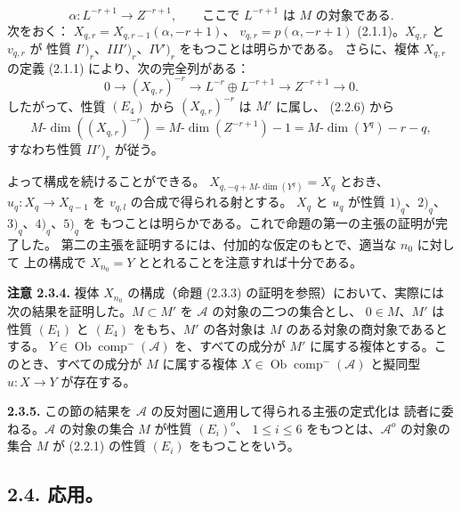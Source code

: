 \clearpage
{}%
\begingroup\small\setlength{\parskip}{0pt}\setlength{\emergencystretch}{1.5em}
\setlength{\abovedisplayskip}{4pt plus 2pt minus 2pt}%
\setlength{\belowdisplayskip}{4pt plus 2pt minus 2pt}%

\[
\alpha\colon L^{-r+1}\longrightarrow Z^{-r+1},
\qquad\text{ここで }L^{-r+1}\text{ は }M\text{ の対象である}.
\]
次をおく：
$X_{q,r}=X_{q,r-1}(\alpha,-r+1)$、
$v_{q,r}=p(\alpha,-r+1)$ (2.1.1)。$X_{q,r}$ と $v_{q,r}$ が
性質 $I')_r$、$III')_r$、$IV')_r$ をもつことは明らかである。
さらに、複体 $X_{q,r}$ の定義 (2.1.1) により、次の完全列がある：
\[
0\longrightarrow (X_{q,r})^{-r}\longrightarrow
L^{-r}\oplus L^{-r+1}\longrightarrow Z^{-r+1}\longrightarrow0.
\]
したがって、性質 $(E_4)$ から $(X_{q,r})^{-r}$ は $M'$ に属し、
(2.2.6) から
\[
M\text{-}\dim((X_{q,r})^{-r})
=M\text{-}\dim(Z^{-r+1})-1
=M\text{-}\dim(Y^q)-r-q,
\]
すなわち性質 $II')_r$ が従う。

よって構成を続けることができる。
$X_{q,-q+M\text{-}\dim(Y^q)}=X_q$ とおき、
$u_q\colon X_q\longrightarrow X_{q-1}$ を $v_{q,l}$ の合成で得られる射とする。
$X_q$ と $u_q$ が性質 $1)_q$、$2)_q$、$3)_q$、$4)_q$、$5)_q$ を
もつことは明らかである。これで命題の第一の主張の証明が完了した。
第二の主張を証明するには、付加的な仮定のもとで、適当な $n_0$ に対して
上の構成で $X_{n_0}=Y$ ととれることを注意すれば十分である。

\medskip\noindent\textbf{注意 2.3.4.}\quad
複体 $X_{n_0}$ の構成（命題 (2.3.3) の証明を参照）において、実際には
次の結果を証明した。$M\subset M'$ を $\mathcal A$ の対象の二つの集合とし、
$0\in M$、$M'$ は性質 $(E_1)$ と $(E_4)$ をもち、$M'$ の各対象は
$M$ のある対象の商対象であるとする。
$Y\in\operatorname{Ob}\operatorname{comp}^{-}(\mathcal A)$ を、すべての成分が
$M'$ に属する複体とする。このとき、すべての成分が $M$ に属する複体
$X\in\operatorname{Ob}\operatorname{comp}^{-}(\mathcal A)$ と擬同型
$u\colon X\longrightarrow Y$ が存在する。

\medskip\noindent\textbf{2.3.5.}\quad
この節の結果を $\mathcal A$ の反対圏に適用して得られる主張の定式化は
読者に委ねる。$\mathcal A$ の対象の集合 $M$ が性質 $(E_i)^o$、
$1\leq i\leq6$ をもつとは、$\mathcal A^o$ の対象の集合 $M$ が
(2.2.1) の性質 $(E_i)$ をもつことをいう。

\subsection*{2.4. 応用。}

